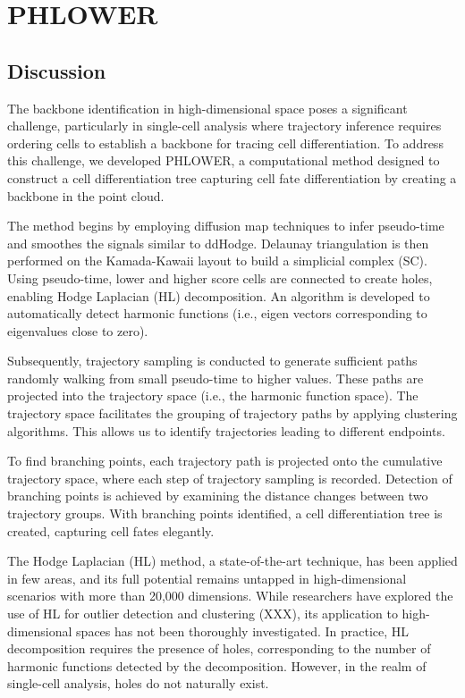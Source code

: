 \section{PHLOWER}
\subsection{Discussion}
The backbone identification in high-dimensional space poses a significant challenge, particularly in single-cell analysis where trajectory inference requires ordering cells to establish a backbone for tracing cell differentiation. To address this challenge, we developed PHLOWER, a computational method designed to construct a cell differentiation tree capturing cell fate differentiation by creating a backbone in the point cloud.

The method begins by employing diffusion map techniques to infer pseudo-time and smoothes the signals similar to ddHodge. Delaunay triangulation is then performed on the Kamada-Kawaii layout to build a simplicial complex (SC). Using pseudo-time, lower and higher score cells are connected to create holes, enabling Hodge Laplacian (HL) decomposition. An algorithm is developed to automatically detect harmonic functions (i.e., eigen vectors corresponding to eigenvalues close to zero).

Subsequently, trajectory sampling is conducted to generate sufficient paths randomly walking from small pseudo-time to higher values. These paths are projected into the trajectory space (i.e., the harmonic function space). The trajectory space facilitates the grouping of trajectory paths by applying clustering algorithms. This allows us to identify trajectories leading to different endpoints.

To find branching points, each trajectory path is projected onto the cumulative trajectory space, where each step of trajectory sampling is recorded. Detection of branching points is achieved by examining the distance changes between two trajectory groups. With branching points identified, a cell differentiation tree is created, capturing cell fates elegantly.


The Hodge Laplacian (HL) method, a state-of-the-art technique, has been applied in few areas, and its full potential remains untapped in high-dimensional scenarios with more than 20,000 dimensions. While researchers have explored the use of HL for outlier detection and clustering \citep{}(XXX), its application to high-dimensional spaces has not been thoroughly investigated. In practice, HL decomposition requires the presence of holes, corresponding to the number of harmonic functions detected by the decomposition. However, in the realm of single-cell analysis, holes do not naturally exist.

